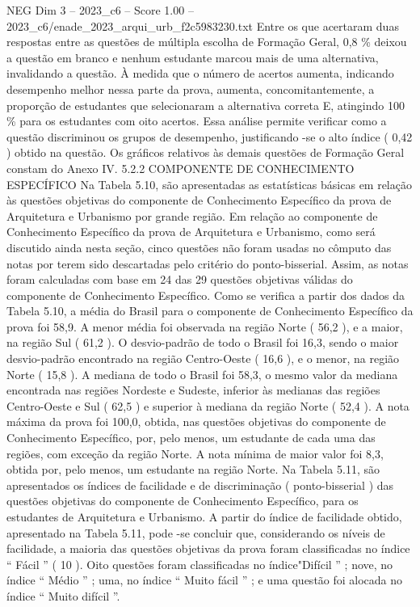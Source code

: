 \begin{textsample}{NEG Dim 3 – 2023\_c6 – Score 1.00 – 2023\_c6/enade\_2023\_arqui\_urb\_f2c5983230.txt}
Entre os que acertaram duas respostas entre as questões de múltipla escolha de Formação Geral, 0,8 \% deixou a questão em branco e nenhum estudante marcou mais de uma alternativa, invalidando a questão.
À medida que o número de acertos aumenta, indicando desempenho melhor nessa parte da prova, aumenta, concomitantemente, a proporção de estudantes que selecionaram a alternativa correta E, atingindo 100 \% para os estudantes com oito acertos.
Essa análise permite verificar como a questão discriminou os grupos de desempenho, justificando -se o alto índice ( 0,42 ) obtido na questão.
Os gráficos relativos às demais questões de Formação Geral constam do Anexo IV. 5.2.2 COMPONENTE DE CONHECIMENTO ESPECÍFICO Na Tabela 5.10, são apresentadas as estatísticas básicas em relação às questões objetivas do componente de Conhecimento Específico da prova de Arquitetura e Urbanismo por grande região.
Em relação ao componente de Conhecimento Específico da prova de Arquitetura e Urbanismo, como será discutido ainda nesta seção, cinco questões não foram usadas no cômputo das notas por terem sido descartadas pelo critério do ponto-bisserial.
Assim, as notas foram calculadas com base em 24 das 29 questões objetivas válidas do componente de Conhecimento Específico.
Como se verifica a partir dos dados da Tabela 5.10, a média do Brasil para o componente de Conhecimento Específico da prova foi 58,9.
A menor média foi observada na região Norte ( 56,2 ), e a maior, na região Sul ( 61,2 ).
O desvio-padrão de todo o Brasil foi 16,3, sendo o maior desvio-padrão encontrado na região Centro-Oeste ( 16,6 ), e o menor, na região Norte ( 15,8 ).
A mediana de todo o Brasil foi 58,3, o mesmo valor da mediana encontrada nas regiões Nordeste e Sudeste, inferior às medianas das regiões Centro-Oeste e Sul ( 62,5 ) e superior à mediana da região Norte ( 52,4 ).
A nota máxima da prova foi 100,0, obtida, nas questões objetivas do componente de Conhecimento Específico, por, pelo menos, um estudante de cada uma das regiões, com exceção da região Norte.
A nota mínima de maior valor foi 8,3, obtida por, pelo menos, um estudante na região Norte.
Na Tabela 5.11, são apresentados os índices de facilidade e de discriminação ( ponto-bisserial ) das questões objetivas do componente de Conhecimento Específico, para os estudantes de Arquitetura e Urbanismo.
A partir do índice de facilidade obtido, apresentado na Tabela 5.11, pode -se concluir que, considerando os níveis de facilidade, a maioria das questões objetivas da prova foram classificadas no índice “ Fácil ” ( 10 ).
Oito questões foram classificadas no índice"Difícil ” ; nove, no índice “ Médio ” ; uma, no índice “ Muito fácil ” ; e uma questão foi alocada no índice “ Muito difícil ”.

\end{textsample}
